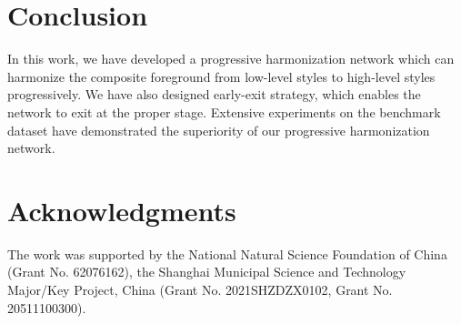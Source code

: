 \documentclass[letterpaper]{article} %
\begin{document}
\section{Conclusion}

In this work, we have developed a progressive harmonization network which can harmonize the composite foreground from low-level styles to high-level styles progressively. We have also designed early-exit strategy, which enables the network to exit at the proper stage. Extensive experiments on the benchmark dataset have demonstrated the superiority of our progressive harmonization network. 

\section*{Acknowledgments}
The work was supported by the National Natural Science Foundation of China (Grant No. 62076162), the Shanghai Municipal Science and Technology Major/Key Project, China (Grant No. 2021SHZDZX0102, Grant No. 20511100300).  



\end{document}
